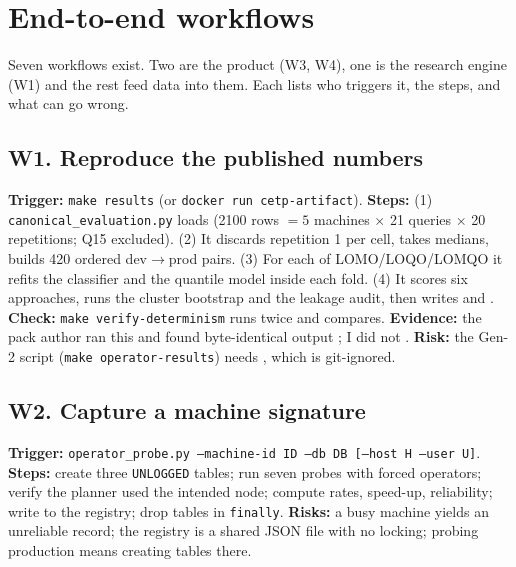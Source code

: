 \chapter{End-to-end workflows}\label{ch:workflows}

Seven workflows exist. Two are the product (W3, W4), one is the research engine (W1) and the rest feed
data into them. Each lists who triggers it, the steps, and what can go wrong.

\section{W1. Reproduce the published numbers}
\textbf{Trigger:} \texttt{make results} (or \texttt{docker run cetp-artifact}). \textbf{Steps:}
(1) \texttt{canonical\_evaluation.py} loads 
(2100 rows $=5$ machines $\times$ 21 queries $\times$ 20 repetitions; Q15 excluded). (2) It discards repetition 1 per cell, takes
medians, builds 420 ordered dev$\to$prod pairs. (3) For each of LOMO/LOQO/LOMQO it refits the classifier and the quantile model
inside each fold. (4) It scores six approaches, runs the cluster bootstrap and the leakage audit, then writes
 and . \textbf{Check:} \texttt{make verify-determinism}
runs twice and compares. \textbf{Evidence:} the pack author ran this and found byte-identical output \evPACK; I did not \evUNK.
\textbf{Risk:} the Gen-2 script (\texttt{make operator-results}) needs , which is git-ignored.

\section{W2. Capture a machine signature}
\textbf{Trigger:} \texttt{operator\_probe.py --machine-id ID --db DB [--host H --user U]}. \textbf{Steps:} create three \texttt{UNLOGGED}
tables; run seven probes with forced operators; verify the planner used the intended node; compute rates, speed-up, reliability;
write to the registry; drop tables in \texttt{finally}. \textbf{Risks:} a busy machine yields an unreliable record; the registry is a shared
JSON file with no locking; probing production means creating tables there.

